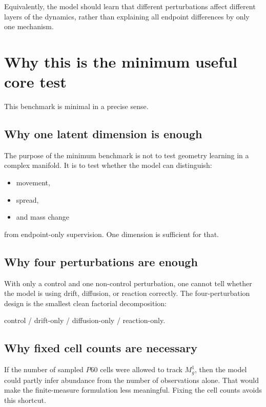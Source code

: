 \documentclass[11pt]{article}
\begin{document}
Equivalently, the model should learn that different perturbations affect different layers of the dynamics, rather than explaining all endpoint differences by only one mechanism.

\section{Why this is the minimum useful core test}

This benchmark is minimal in a precise sense.

\subsection{Why one latent dimension is enough}

The purpose of the minimum benchmark is not to test geometry learning in a complex manifold. It is to test whether the model can distinguish:
\begin{itemize}[leftmargin=2em]
    \item movement,
    \item spread,
    \item and mass change
\end{itemize}
from endpoint-only supervision. One dimension is sufficient for that.

\subsection{Why four perturbations are enough}

With only a control and one non-control perturbation, one cannot tell whether the model is using drift, diffusion, or reaction correctly. The four-perturbation design is the smallest clean factorial decomposition:
\begin{center}
control \quad / \quad drift-only \quad / \quad diffusion-only \quad / \quad reaction-only.
\end{center}

\subsection{Why fixed cell counts are necessary}

If the number of sampled $P60$ cells were allowed to track \(M_g^1\), then the model could partly infer abundance from the number of observations alone. That would make the finite-measure formulation less meaningful. Fixing the cell counts avoids this shortcut.
\end{document}
